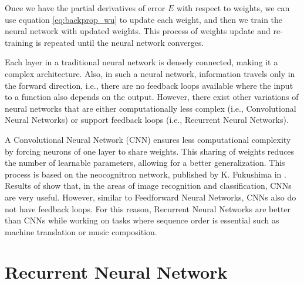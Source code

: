 Once we have the partial derivatives of error $E$ with respect to weights, we can use equation \ref{eq:backprop_wu} to update each weight, and then we train the neural network with updated weights. This process of weights update and re-training is repeated until the neural network converges.

Each layer in a traditional neural network is densely connected, making it a complex architecture. Also, in such a neural network, information travels only in the forward direction, i.e., there are no feedback loops available where the input to a function also depends on the output. However, there exist other variations of neural networks that are either computationally less complex (i.e., Convolutional Neural Networks) or support feedback loops (i.e., Recurrent Neural Networks).

A Convolutional Neural Network (CNN) ensures less computational complexity by forcing neurons of one layer to share weights. This sharing of weights reduces the number of learnable parameters, allowing for a better generalization. This process is based on the neocognitron network, published by K. Fukushima in \cite{neocognitronbc}. Results of \cite{7382560, 7822567} show that, in the areas of image recognition and classification, CNNs are very useful. However, similar to Feedforward Neural Networks, CNNs also do not have feedback loops. For this reason, Recurrent Neural Networks are better than CNNs while working on tasks where sequence order is essential such as machine translation or music composition.


\newpage
\section{Recurrent Neural Network}\label{section:rnn}

